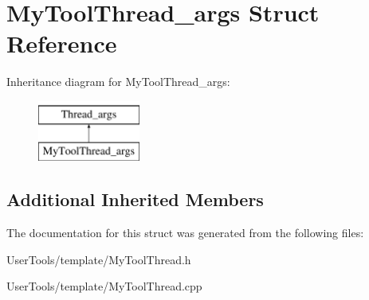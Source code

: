 \hypertarget{structMyToolThread__args}{\section{My\-Tool\-Thread\-\_\-args Struct Reference}
\label{structMyToolThread__args}
}
Inheritance diagram for My\-Tool\-Thread\-\_\-args\-:\begin{figure}[H]
\begin{center}
\leavevmode
\includegraphics[height=2.000000cm]{structMyToolThread__args}
\end{center}
\end{figure}
\subsection*{Additional Inherited Members}


The documentation for this struct was generated from the following files\-:\begin{DoxyCompactItemize}
\item 
User\-Tools/template/My\-Tool\-Thread.\-h\item 
User\-Tools/template/My\-Tool\-Thread.\-cpp\end{DoxyCompactItemize}
